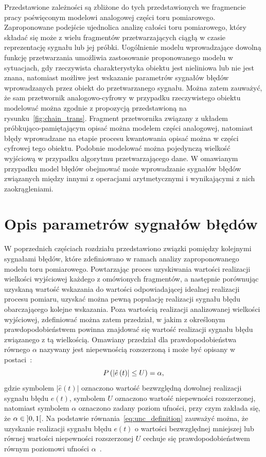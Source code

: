 Przedstawione zależności są zbliżone do tych przedstawionych we fragmencie pracy poświęconym modelowi analogowej części toru pomiarowego. Zaproponowane podejście ujednolica analizę całości toru pomiarowego, który składać się może z wielu fragmentów przetwarzających ciągłą w czasie reprezentację sygnału lub jej próbki. Uogólnienie modelu wprowadzające dowolną funkcję przetwarzania umożliwia zastosowanie proponowanego modelu w sytuacjach, gdy rzeczywista charakterystyka obiektu jest nieliniowa lub nie jest znana, natomiast możliwe jest wskazanie parametrów sygnałów błędów wprowadzanych przez obiekt do przetwarzanego sygnału. Można zatem zauważyć, że sam przetwornik analogowo-cyfrowy w przypadku rzeczywistego obiektu modelować można zgodnie z propozycją przedstawioną na rysunku~\ref{fig:chain_trans}. Fragment przetwornika związany z układem próbkująco-pamiętającym opisać można modelem części analogowej, natomiast błędy wprowadzane na etapie procesu kwantowania opisać można w części cyfrowej tego obiektu. Podobnie modelować można pojedynczą wielkość wyjściową w przypadku algorytmu przetwarzającego dane. W omawianym przypadku model błędów obejmować może wprowadzanie sygnałów błędów związanych między innymi z operacjami arytmetycznymi i wynikającymi z nich zaokrągleniami.

\section{Opis parametrów sygnałów błędów}

W poprzednich częściach rozdziału przedstawiono związki pomiędzy kolejnymi sygnałami błędów, które zdefiniowano w ramach analizy zaproponowanego modelu toru pomiarowego. Powtarzając proces uzyskiwania wartości realizacji wielkości wyjściowej każdego z omówionych fragmentów, a następnie porównując uzyskaną wartość wskazania do wartości odpowiadającej idealnej realizacji procesu pomiaru, uzyskać można pewną populację realizacji sygnału błędu obarczającego kolejne wskazania. Poza wartością realizacji analizowanej wielkości wyjściowej, zdefiniować można zatem przedział, w jakim z określonym prawdopodobieństwem powinna znajdować się wartość realizacji sygnału błędu związanego z tą wielkością. Omawiany przedział dla prawdopodobieństwa równego $\alpha$ nazywany jest niepewnością rozszerzoną i może być opisany w postaci~\cite{jcgm_guide}:
\begin{equation}
P \left(\left|\hat{e} \left(t\right)\right| \le U\right) = \alpha \label{eq:unc_definition},
\end{equation}
gdzie symbolem $|\hat{e}(t)|$ oznaczono wartość bezwzględną dowolnej realizacji sygnału błędu $e(t)$, symbolem $U$ oznaczono wartość niepewności rozszerzonej, natomiast symbolem $\alpha$ oznaczono zadany poziom ufności, przy czym zakłada się, że $\alpha \in \ointerval{0}{1}$. Na podstawie równania~\eqref{eq:unc_definition} zauważyć można, że uzyskanie realizacji sygnału błędu $e(t)$ o wartości bezwzględnej mniejszej lub równej wartości niepewności rozszerzonej $U$ cechuje się prawdopodobieństwem równym poziomowi ufności $\alpha$~\cite{jcgm_guide}.

